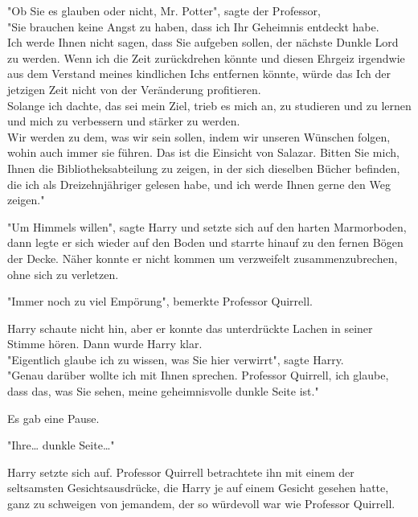 {"Ob Sie es glauben oder nicht, Mr. Potter", sagte der Professor,\\ "Sie brauchen keine Angst zu haben, dass ich Ihr Geheimnis entdeckt habe.\\ Ich werde Ihnen nicht sagen, dass Sie aufgeben sollen, der nächste Dunkle Lord zu werden. Wenn ich die Zeit zurückdrehen könnte und diesen Ehrgeiz irgendwie aus dem Verstand meines kindlichen Ichs entfernen könnte, würde das Ich der jetzigen Zeit nicht von der Veränderung profitieren.\\ Solange ich dachte, das sei mein Ziel, trieb es mich an, zu studieren und zu lernen und mich zu verbessern und stärker zu werden.\\ Wir werden zu dem, was wir sein sollen, indem wir unseren Wünschen folgen, wohin auch immer sie führen. Das ist die Einsicht von Salazar. Bitten Sie mich, Ihnen die Bibliotheksabteilung zu zeigen, in der sich dieselben Bücher befinden, die ich als Dreizehnjähriger gelesen habe, und ich werde Ihnen gerne den Weg zeigen."

"Um Himmels willen", sagte Harry und setzte sich auf den harten Marmorboden, dann legte er sich wieder auf den Boden und starrte hinauf zu den fernen Bögen der Decke. Näher konnte er nicht kommen um verzweifelt zusammenzubrechen, ohne sich zu verletzen.

"Immer noch zu viel Empörung", bemerkte Professor Quirrell.

Harry schaute nicht hin, aber er konnte das unterdrückte Lachen in seiner Stimme hören. Dann wurde Harry klar.\\ "Eigentlich glaube ich zu wissen, was Sie hier verwirrt", sagte Harry.\\ "Genau darüber wollte ich mit Ihnen sprechen. Professor Quirrell, ich glaube, dass das, was Sie sehen, meine geheimnisvolle dunkle Seite ist."

Es gab eine Pause.

"Ihre… dunkle Seite…"

Harry setzte sich auf. Professor Quirrell betrachtete ihn mit einem der seltsamsten Gesichtsausdrücke, die Harry je auf einem Gesicht gesehen hatte, ganz zu schweigen von jemandem, der so würdevoll war wie Professor Quirrell.

}

